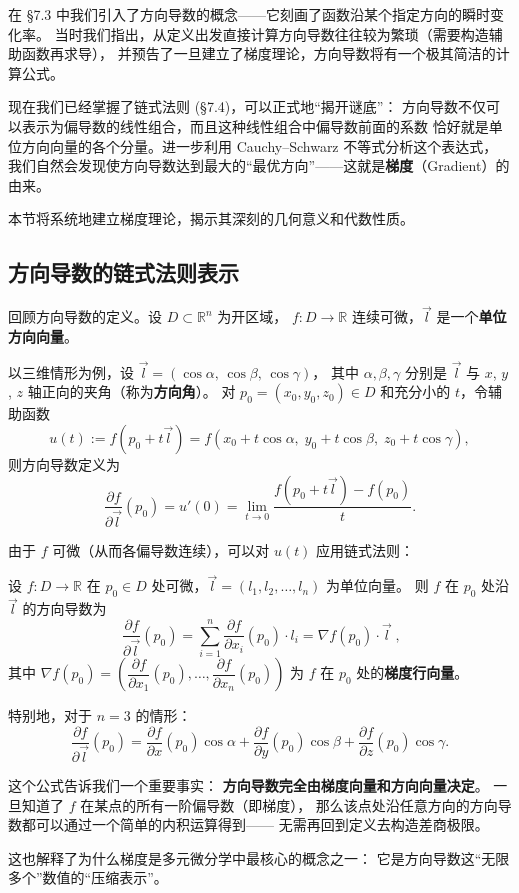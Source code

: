 \documentclass[lang=cn,11pt]{elegantbook}
\begin{document}
在 §7.3 中我们引入了方向导数的概念——它刻画了函数沿某个指定方向的瞬时变化率。
当时我们指出，从定义出发直接计算方向导数往往较为繁琐（需要构造辅助函数再求导），
并预告了一旦建立了梯度理论，方向导数将有一个极其简洁的计算公式。

现在我们已经掌握了链式法则 (§7.4)，可以正式地“揭开谜底”：
方向导数不仅可以表示为偏导数的线性组合，而且这种线性组合中偏导数前面的系数
恰好就是单位方向向量的各个分量。进一步利用 Cauchy--Schwarz 不等式分析这个表达式，
我们自然会发现使方向导数达到最大的“最优方向”——这就是\textbf{梯度}（Gradient）的由来。

本节将系统地建立梯度理论，揭示其深刻的几何意义和代数性质。


\subsection{方向导数的链式法则表示}

回顾方向导数的定义。设 $D\subset\mathbb R^n$ 为开区域，
$f:D\to\mathbb R$ 连续可微，$\vec l$ 是一个\textbf{单位方向向量}。

以三维情形为例，设 $\vec l=(\cos\alpha,\,\cos\beta,\,\cos\gamma)$，
其中 $\alpha,\beta,\gamma$ 分别是 $\vec l$ 与 $x$, $y$, $z$ 轴正向的夹角（称为\textbf{方向角}）。
对 $p_0=(x_0,y_0,z_0)\in D$ 和充分小的 $t$，令辅助函数
\[
u(t):=f(p_0+t\vec l)
   =f(x_0+t\cos\alpha,\;y_0+t\cos\beta,\;z_0+t\cos\gamma),
\]
则方向导数定义为
\[
\frac{\partial f}{\partial\vec l}(p_0)
=u'(0)=\lim_{t\to 0}\frac{f(p_0+t\vec l)-f(p_0)}{t}.
\]

由于 $f$ 可微（从而各偏导数连续），可以对 $u(t)$ 应用链式法则：

\begin{property}[方向导数的链式法则公式] \label{prop:directional-via-chain}
设 $f:D\to\mathbb R$ 在 $p_0\in D$ 处可微，$\vec l=(l_1,l_2,\dots,l_n)$ 为单位向量。
则 $f$ 在 $p_0$ 处沿 $\vec l$ 的方向导数为
\[
\boxed{\;
\frac{\partial f}{\partial\vec l}(p_0)
=\sum_{i=1}^{n}\frac{\partial f}{\partial x_i}(p_0)\cdot l_i
=\nabla f(p_0)\cdot\vec l
\;},
\]
其中 $\nabla f(p_0)=\left(\dfrac{\partial f}{\partial x_1}(p_0),\dots,
\dfrac{\partial f}{\partial x_n}(p_0)\right)$ 为 $f$ 在 $p_0$ 处的\textbf{梯度行向量}。
\end{property}

特别地，对于 $n=3$ 的情形：
\[
\frac{\partial f}{\partial\vec l}(p_0)
=\frac{\partial f}{\partial x}(p_0)\cos\alpha
 +\frac{\partial f}{\partial y}(p_0)\cos\beta
 +\frac{\partial f}{\partial z}(p_0)\cos\gamma.
\]

\begin{remark}[公式的直观理解]
这个公式告诉我们一个重要事实：
\textbf{方向导数完全由梯度向量和方向向量决定}。
一旦知道了 $f$ 在某点的所有一阶偏导数（即梯度），
那么该点处沿任意方向的方向导数都可以通过一个简单的内积运算得到——
无需再回到定义去构造差商极限。

这也解释了为什么梯度是多元微分学中最核心的概念之一：
它是方向导数这“无限多个”数值的“压缩表示”。
\end{remark}
\end{document}
